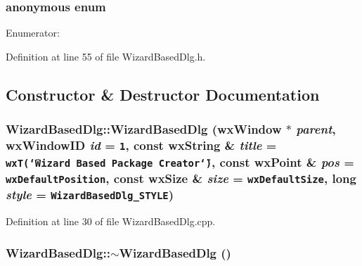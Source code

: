 \subsubsection{\setlength{\rightskip}{0pt plus 5cm}anonymous enum\hspace{0.3cm}{\tt  [private]}}\label{class_wizard_based_dlg_48c4bd58c133612c3214f11c83c11a3f}


\begin{Desc}
\item[Enumerator: ]\par
\begin{description}
\item[{\em 
ID\_\-DUMMY\_\-VALUE\_\-\label{class_wizard_based_dlg_48c4bd58c133612c3214f11c83c11a3fbec6e7165de50e218a1f1c8d404a4dcc}
}]\end{description}
\end{Desc}



Definition at line 55 of file Wizard\-Based\-Dlg.h.

\subsection{Constructor \& Destructor Documentation}
\subsubsection{\setlength{\rightskip}{0pt plus 5cm}Wizard\-Based\-Dlg::Wizard\-Based\-Dlg (wx\-Window $\ast$ {\em parent}, wx\-Window\-ID {\em id} = {\tt 1}, const wx\-String \& {\em title} = {\tt wxT(\char`\"{}Wizard~Based~Package~Creator\char`\"{})}, const wx\-Point \& {\em pos} = {\tt wxDefaultPosition}, const wx\-Size \& {\em size} = {\tt wxDefaultSize}, long {\em style} = {\tt WizardBasedDlg\_\-STYLE})}\label{class_wizard_based_dlg_32638356b635cb0291d6058428351514}




Definition at line 30 of file Wizard\-Based\-Dlg.cpp.
\subsubsection{\setlength{\rightskip}{0pt plus 5cm}Wizard\-Based\-Dlg::$\sim$Wizard\-Based\-Dlg ()\hspace{0.3cm}{\tt  [virtual]}}\label{class_wizard_based_dlg_fe9a44c44fd8c7ff2c6aebf0ee52f336}




